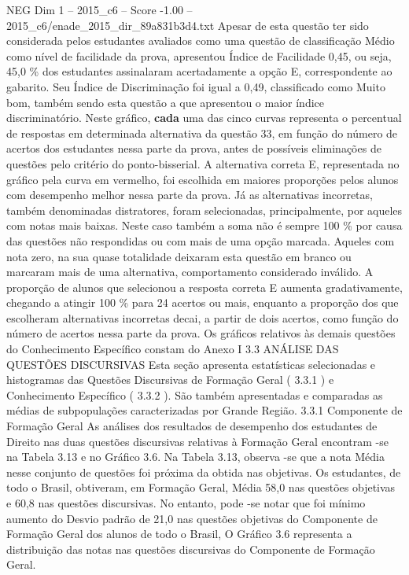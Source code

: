 \begin{textsample}{NEG Dim 1 – 2015\_c6 – Score -1.00 – 2015\_c6/enade\_2015\_dir\_89a831b3d4.txt}
Apesar de esta questão ter sido considerada pelos estudantes avaliados como uma questão de classificação Médio como nível de facilidade da prova, apresentou Índice de Facilidade 0,45, ou seja, 45,0 \% dos estudantes assinalaram acertadamente a opção E, correspondente ao gabarito.
Seu Índice de Discriminação foi igual a 0,49, classificado como Muito bom, também sendo esta questão a que apresentou o maior índice discriminatório.
Neste gráfico, \textbf{cada} uma das cinco curvas representa o percentual de respostas em determinada alternativa da questão 33, em função do número de acertos dos estudantes nessa parte da prova, antes de possíveis eliminações de questões pelo critério do ponto-bisserial.
A alternativa correta E, representada no gráfico pela curva em vermelho, foi escolhida em maiores proporções pelos alunos com desempenho melhor nessa parte da prova.
Já as alternativas incorretas, também denominadas distratores, foram selecionadas, principalmente, por aqueles com notas mais baixas.
Neste caso também a soma não é sempre 100 \% por causa das questões não respondidas ou com mais de uma opção marcada.
Aqueles com nota zero, na sua quase totalidade deixaram esta questão em branco ou marcaram mais de uma alternativa, comportamento considerado inválido.
A proporção de alunos que selecionou a resposta correta E aumenta gradativamente, chegando a atingir 100 \% para 24 acertos ou mais, enquanto a proporção dos que escolheram alternativas incorretas decai, a partir de dois acertos, como função do número de acertos nessa parte da prova.
Os gráficos relativos às demais questões do Conhecimento Específico constam do Anexo I 3.3 ANÁLISE DAS QUESTÕES DISCURSIVAS Esta seção apresenta estatísticas selecionadas e histogramas das Questões Discursivas de Formação Geral ( 3.3.1 ) e Conhecimento Específico ( 3.3.2 ).
São também apresentadas e comparadas as médias de subpopulações caracterizadas por Grande Região. 3.3.1 Componente de Formação Geral As análises dos resultados de desempenho dos estudantes de Direito nas duas questões discursivas relativas à Formação Geral encontram -se na Tabela 3.13 e no Gráfico 3.6.
Na Tabela 3.13, observa -se que a nota Média nesse conjunto de questões foi próxima da obtida nas objetivas.
Os estudantes, de todo o Brasil, obtiveram, em Formação Geral, Média 58,0 nas questões objetivas e 60,8 nas questões discursivas.
No entanto, pode -se notar que foi mínimo aumento do Desvio padrão de 21,0 nas questões objetivas do Componente de Formação Geral dos alunos de todo o Brasil, O Gráfico 3.6 representa a distribuição das notas nas questões discursivas do Componente de Formação Geral.

\end{textsample}

